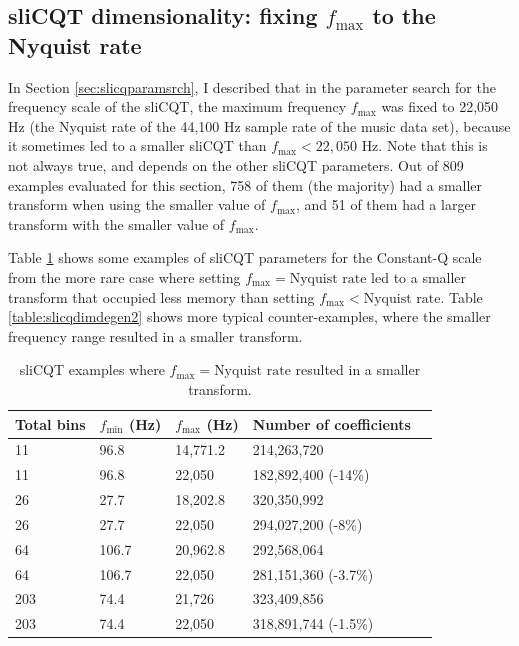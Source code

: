 \documentclass[report.tex]{subfiles}
\begin{document}
\begin{appendices}
\newpagefill

\section{sliCQT dimensionality: fixing $f_{\text{max}}$ to the Nyquist rate}
\label{appendix:slicqdim1}

In Section \ref{sec:slicqparamsrch}, I described that in the parameter search for the frequency scale of the sliCQT, the maximum frequency $f_{\text{max}}$ was fixed to 22,050 Hz (the Nyquist rate of the 44,100 Hz sample rate of the music data set), because it sometimes led to a smaller sliCQT than $f_{\text{max}} < 22,050 \text{ Hz}$. Note that this is not always true, and depends on the other sliCQT parameters. Out of 809 examples evaluated for this section, 758 of them (the majority) had a smaller transform when using the smaller value of $f_{\text{max}}$, and 51 of them had a larger transform with the smaller value of $f_{\text{max}}$.

Table \ref{table:slicqdimdegen1} shows some examples of sliCQT parameters for the Constant-Q scale from the more rare case where setting $f_{\text{max}} = \text{Nyquist rate}$ led to a smaller transform that occupied less memory than setting $f_{\text{max}} < \text{Nyquist rate}$. Table \ref{table:slicqdimdegen2} shows more typical counter-examples, where the smaller frequency range resulted in a smaller transform.

\begin{table}[ht]
	\centering
	\caption{sliCQT examples where $f_{\text{max}} = \text{Nyquist rate}$ resulted in a smaller transform.}
	\label{table:slicqdimdegen1}
\begin{tabular}{ |l|l|l|l|l| }
	 \hline
	 Total bins & $f_{\text{min}}$ (Hz) & $f_{\text{max}}$ (Hz) & Number of coefficients \\
	 \hline
	 \hline
	 11 & 96.8 & 14,771.2 & 214,263,720 \\
	 \hline
	 11 & 96.8 & 22,050 & 182,892,400 (-14\%) \\
	 \hline
	 \hline
	 26 & 27.7 & 18,202.8 & 320,350,992 \\
	 \hline
	 26 & 27.7 & 22,050 & 294,027,200 (-8\%) \\
	 \hline
	 \hline
	 64 & 106.7 & 20,962.8 & 292,568,064 \\
	 \hline
	 64 & 106.7 & 22,050 & 281,151,360 (-3.7\%) \\
	 \hline
	 \hline
	 203 & 74.4 & 21,726 & 323,409,856 \\
	 \hline
	 203 & 74.4 & 22,050 & 318,891,744 (-1.5\%) \\
	 \hline
\end{tabular}
\end{table}


\end{appendices}
\end{document}

